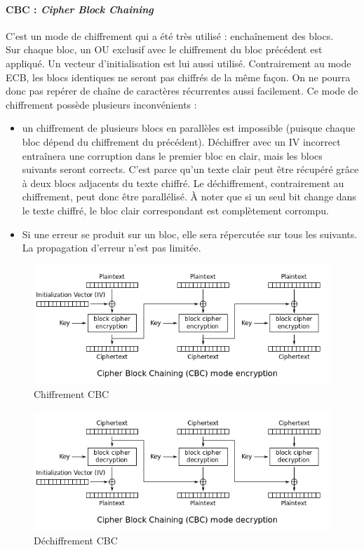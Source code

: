 \paragraph{CBC : \textit{Cipher Block Chaining} \\}
C'est un mode de chiffrement qui a été très utilisé : enchaînement des blocs.\\
Sur chaque bloc, un OU exclusif avec le chiffrement du bloc précédent est appliqué. Un vecteur d'initialisation est lui aussi utilisé. Contrairement au mode ECB, les blocs identiques ne seront pas chiffrés de la même façon. On ne pourra donc pas repérer de chaîne de caractères récurrentes aussi facilement. Ce mode de chiffrement possède plusieurs inconvénients :
\begin{itemize}
\item un chiffrement de plusieurs blocs en parallèles est impossible (puisque chaque bloc dépend du chiffrement du précédent). Déchiffrer avec un IV incorrect entraînera une corruption dans le premier bloc en clair, mais les blocs suivants seront corrects. C'est parce qu'un texte clair peut être récupéré grâce à deux blocs adjacents du texte chiffré. Le déchiffrement, contrairement au chiffrement, peut donc être parallélisé. À noter que si un seul bit change dans le texte chiffré, le bloc clair correspondant est complètement corrompu.
\item Si une erreur se produit sur un bloc, elle sera répercutée sur tous les suivants. La propagation d'erreur n'est pas limitée.
\end{itemize}
\begin{figure}[H]
\centering
\includegraphics[width=13cm]{images/CBC_chiff.png}
\caption{Chiffrement CBC}
\label{CBC_chiff}
\end{figure}

\begin{figure}[H]
\centering
\includegraphics[width=13cm]{images/CBC_dechiff.png}
\caption{Déchiffrement CBC}
\label{CBC_dechiff}
\end{figure}

